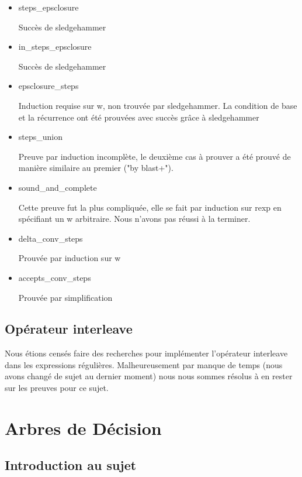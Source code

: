 \documentclass{article}
\begin{document}
\begin{itemize}


\item steps\_epsclosure

  Succès de sledgehammer

\item in\_steps\_epsclosure

  Succès de sledgehammer

\item epsclosure\_steps

  Induction requise sur w, non trouvée par sledgehammer. La condition de base et la récurrence ont été prouvées avec succès grâce à sledgehammer

\item steps\_union

  Preuve par induction incomplète, le deuxième cas à prouver a été prouvé de manière similaire au premier ("by blast+").

\item sound\_and\_complete

  Cette preuve fut la plus compliquée, elle se fait par induction sur rexp en spécifiant un w arbitraire. Nous n'avons pas réussi à la terminer.

\item delta\_conv\_steps

  Prouvée par induction sur w

\item accepts\_conv\_steps

  Prouvée par simplification

\end{itemize}

\subsection{Opérateur interleave}

Nous étions censés faire des recherches pour implémenter l'opérateur interleave dans les expressions régulières. Malheureusement par manque de temps (nous avons changé de sujet au dernier moment) nous nous sommes résolus à en rester sur les preuves pour ce sujet.

\section{Arbres de Décision}

\subsection{Introduction au sujet}
\end{document}
